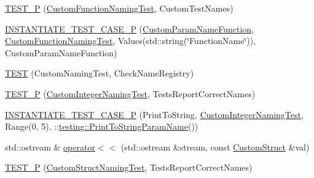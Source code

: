 \begin{DoxyCompactItemize}
\item 
\mbox{\hyperlink{_obj__test_2lib_2googletest-release-1_88_81_2googletest_2test_2googletest-param-test-test_8cc_a72ff5cb3613a060e1a62f14fa3fa1b52}{T\+E\+S\+T\+\_\+P}} (\mbox{\hyperlink{class_custom_function_naming_test}{Custom\+Function\+Naming\+Test}}, Custom\+Test\+Names)
\item 
\mbox{\hyperlink{_obj__test_2lib_2googletest-release-1_88_81_2googletest_2test_2googletest-param-test-test_8cc_a2dac83a6fce73f581d62a31f27c29db4}{I\+N\+S\+T\+A\+N\+T\+I\+A\+T\+E\+\_\+\+T\+E\+S\+T\+\_\+\+C\+A\+S\+E\+\_\+P}} (\mbox{\hyperlink{_obj__test_2lib_2googletest-release-1_88_81_2googletest_2test_2googletest-param-test-test_8cc_a016a6f23e3fe3de5183e5493cf4bcc4f}{Custom\+Param\+Name\+Function}}, \mbox{\hyperlink{class_custom_function_naming_test}{Custom\+Function\+Naming\+Test}}, Values(std\+::string(\char`\"{}Function\+Name\char`\"{})), Custom\+Param\+Name\+Function)
\item 
\mbox{\hyperlink{_obj__test_2lib_2googletest-release-1_88_81_2googletest_2test_2googletest-param-test-test_8cc_a19d5fdc7df4c845bc0f2e7c50368e2a6}{T\+E\+ST}} (Custom\+Naming\+Test, Check\+Name\+Registry)
\item 
\mbox{\hyperlink{_obj__test_2lib_2googletest-release-1_88_81_2googletest_2test_2googletest-param-test-test_8cc_a0c9938b5941817c8181cab2de13ae24d}{T\+E\+S\+T\+\_\+P}} (\mbox{\hyperlink{class_custom_integer_naming_test}{Custom\+Integer\+Naming\+Test}}, Tests\+Report\+Correct\+Names)
\item 
\mbox{\hyperlink{_obj__test_2lib_2googletest-release-1_88_81_2googletest_2test_2googletest-param-test-test_8cc_a17fa3cbf3d7012f451beed5c2ce6d0d9}{I\+N\+S\+T\+A\+N\+T\+I\+A\+T\+E\+\_\+\+T\+E\+S\+T\+\_\+\+C\+A\+S\+E\+\_\+P}} (Print\+To\+String, \mbox{\hyperlink{class_custom_integer_naming_test}{Custom\+Integer\+Naming\+Test}}, Range(0, 5), \+::\mbox{\hyperlink{structtesting_1_1_print_to_string_param_name}{testing\+::\+Print\+To\+String\+Param\+Name}}())
\item 
std\+::ostream \& \mbox{\hyperlink{_obj__test_2lib_2googletest-release-1_88_81_2googletest_2test_2googletest-param-test-test_8cc_a9751bdd724ed1a62f98208cf310bc1d9}{operator$<$$<$}} (std\+::ostream \&stream, const \mbox{\hyperlink{struct_custom_struct}{Custom\+Struct}} \&val)
\item 
\mbox{\hyperlink{_obj__test_2lib_2googletest-release-1_88_81_2googletest_2test_2googletest-param-test-test_8cc_a20d9b65a9ff30edb2daf274bc13ba3d7}{T\+E\+S\+T\+\_\+P}} (\mbox{\hyperlink{class_custom_struct_naming_test}{Custom\+Struct\+Naming\+Test}}, Tests\+Report\+Correct\+Names)

\end{DoxyCompactItemize}
